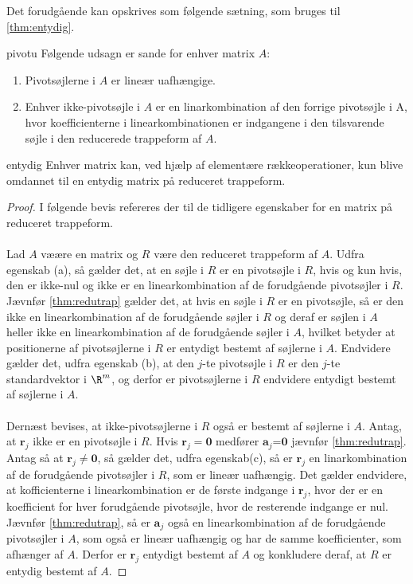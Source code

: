 %
Det forudgående kan opskrives som følgende sætning, som bruges til \ref{thm:entydig}.
%
\begin{thm}{}{pivotu}
Følgende udsagn er sande for enhver matrix $A$: 
\begin{enumerate}[label=(\alph*)]
\item Pivotsøjlerne i $A$ er lineær uafhængige. 
\item Enhver ikke-pivotsøjle i $A$ er en linarkombination af den forrige pivotsøjle i A, hvor koefficienterne i linearkombinationen er indgangene i den tilsvarende søjle i den reducerede trappeform af $A$. 
\end{enumerate} 
\end{thm}
%
\begin{thm}{}{entydig}
Enhver matrix kan, ved hjælp af elementære rækkeoperationer, kun blive omdannet til en entydig matrix på reduceret trappeform.
\end{thm}
%
\begin{proof}
I følgende bevis refereres der til de tidligere egenskaber for en matrix på reduceret trappeform. \\\\
Lad $A$ væære en matrix og $R$ være den reduceret trappeform af $A$. 
Udfra egenskab (a), så gælder det, at en søjle i $R$ er en pivotsøjle i $R$, hvis og kun hvis, den er ikke-nul og ikke er en linearkombination af de forudgående pivotsøjler i $R$. 
Jævnfør \ref{thm:redutrap} gælder det, at hvis en søjle i $R$ er en pivotsøjle, så er den ikke en linearkombination af de forudgående søjler i $R$ og deraf er søjlen i $A$ heller ikke en linearkombination af de forudgående  søjler i $A$, hvilket betyder at positionerne af pivotsøjlerne i $R$ er entydigt bestemt af søjlerne i $A$. 
Endvidere gælder det, udfra egenskab (b), at den $j$-te pivotsøjle i $R$ er den $j$-te standardvektor i $\R^m$, og derfor er pivotsøjlerne i $R$ endvidere entydigt bestemt af søjlerne i $A$. \\\\
Dernæst bevises, at ikke-pivotsøjlerne i $R$ også er bestemt af søjlerne i $A$. 
Antag, at $\textbf{r}_j$ ikke er en pivotsøjle i $R$.
Hvis $\textbf{r}_j=\textbf{0}$ medfører $\textbf{a}_j$=$\textbf{0}$ jævnfør \ref{thm:redutrap}. 
Antag så at $\textbf{r}_j \neq \textbf{0}$, så gælder det, udfra egenskab(c), så er $\textbf{r}_j$ en linarkombination af de forudgående pivotsøjler i $R$, som er lineær uafhængig. 
Det gælder endvidere, at kofficienterne i linearkombination er de første indgange i $\textbf{r}_j$, hvor der er en koefficient for hver forudgående pivotsøjle, hvor de resterende indgange er nul. 
Jævnfør \ref{thm:redutrap}, så er $\textbf{a}_j$ også en linearkombination af de forudgående pivotsøjler i $A$, som også er lineær uafhængig og har de samme koefficienter, som afhænger af $A$. 
Derfor er $\textbf{r}_j$ entydigt bestemt af $A$ og konkludere deraf, at $R$ er entydig bestemt af $A$. 
\end{proof}
